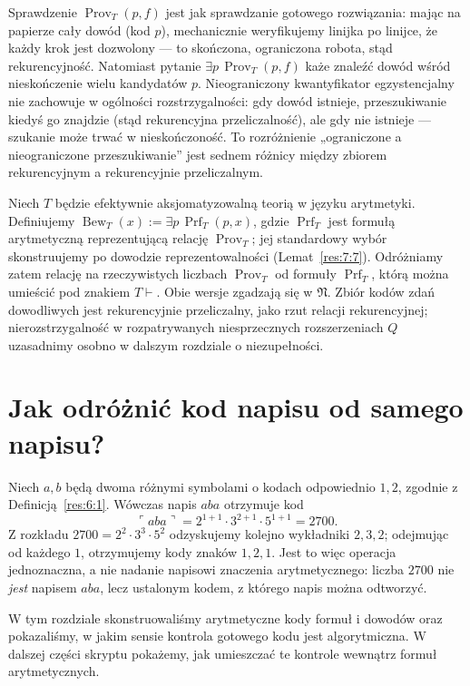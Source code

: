 \begin{przyklad}\label{res:6:6}
Sprawdzenie $\operatorname{Prov}_T(p,f)$ jest jak sprawdzanie gotowego rozwiązania: mając na papierze cały dowód (kod $p$), mechanicznie weryfikujemy linijka po linijce, że każdy krok jest dozwolony --- to skończona, ograniczona robota, stąd rekurencyjność. Natomiast pytanie $\exists p\,\operatorname{Prov}_T(p,f)$ każe znaleźć dowód wśród nieskończenie wielu kandydatów $p$. Nieograniczony kwantyfikator egzystencjalny nie zachowuje w ogólności rozstrzygalności: gdy dowód istnieje, przeszukiwanie kiedyś go znajdzie (stąd rekurencyjna przeliczalność), ale gdy nie istnieje --- szukanie może trwać w nieskończoność. To rozróżnienie „ograniczone a nieograniczone przeszukiwanie” jest sednem różnicy między zbiorem rekurencyjnym a rekurencyjnie przeliczalnym.
\end{przyklad}

\begin{definicja}\label{res:6:7}
Niech $T$ będzie efektywnie aksjomatyzowalną teorią w języku arytmetyki. Definiujemy $\operatorname{Bew}_T(x):=\exists p\,\operatorname{Prf}_T(p,x)$, gdzie $\operatorname{Prf}_T$ jest formułą arytmetyczną reprezentującą relację $\operatorname{Prov}_T$; jej standardowy wybór skonstruujemy po dowodzie reprezentowalności (Lemat~\ref{res:7:7}). Odróżniamy zatem relację na rzeczywistych liczbach $\operatorname{Prov}_T$ od formuły $\operatorname{Prf}_T$, którą można umieścić pod znakiem $T\vdash$. Obie wersje zgadzają się w $\mathfrak N$. Zbiór kodów zdań dowodliwych jest rekurencyjnie przeliczalny, jako rzut relacji rekurencyjnej; nierozstrzygalność w rozpatrywanych niesprzecznych rozszerzeniach $Q$ uzasadnimy osobno w dalszym rozdziale o niezupełności.
\end{definicja}



\section{Jak odróżnić kod napisu od samego napisu?}
\begin{przyklad}
Niech $a,b$ będą dwoma różnymi symbolami o kodach odpowiednio $1,2$,
zgodnie z Definicją~\ref{res:6:1}. Wówczas napis $aba$ otrzymuje kod
\[
\ulcorner aba\urcorner=2^{1+1}\cdot3^{2+1}\cdot5^{1+1}=2700.
\]
Z rozkładu $2700=2^2\cdot3^3\cdot5^2$ odzyskujemy
kolejno wykładniki $2,3,2$; odejmując od każdego $1$,
otrzymujemy kody znaków $1,2,1$. Jest to więc
operacja jednoznaczna, a nie nadanie napisowi znaczenia
arytmetycznego: liczba $2700$ nie \emph{jest} napisem $aba$,
lecz ustalonym kodem, z którego napis można odtworzyć.
\end{przyklad}
\begin{uwaga}
W tym rozdziale skonstruowaliśmy arytmetyczne kody
formuł i dowodów oraz pokazaliśmy, w jakim sensie
kontrola gotowego kodu jest algorytmiczna. W dalszej
części skryptu pokażemy, jak umieszczać te kontrole
wewnątrz formuł arytmetycznych.
\end{uwaga}